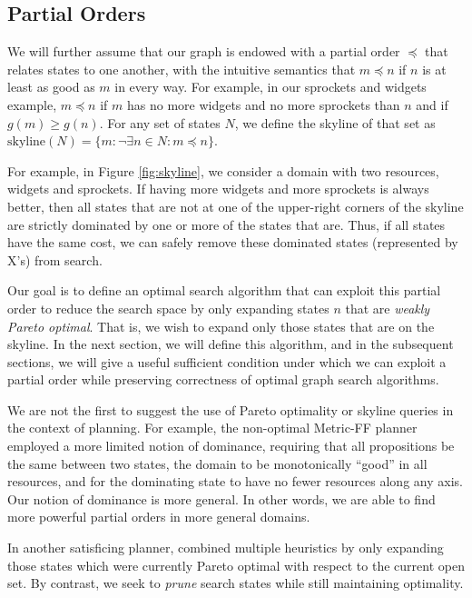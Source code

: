 \documentclass[letterpaper]{article}
\theoremstyle{plain} \newtheorem{theorem}{Theorem} \newtheorem{proposition}{Proposition} \newtheorem{lemma}{Lemma}
\theoremstyle{definition} \newtheorem{definition}{Definition} \newtheorem{conjecture}{Conjecture} \newtheorem*{example}{Example}
\theoremstyle{remark} \newtheorem*{remark}{Remark} \newtheorem*{note}{Note} \newtheorem{case}{Case}
\begin{document}
\subsection{Partial Orders}

We will further assume that our graph is endowed with a partial
order $\preceq$ that relates states to one another, with the
intuitive semantics that $m \preceq n$ if $n$ is at least as good as $m$
in every way. For example, in our sprockets and widgets example, $m
\preceq n$ if $m$ has no more widgets and no more sprockets than
$n$ and if $g(m) \ge g(n)$. For any
set of states $N$, we define the skyline of that set as
$\textrm{skyline}(N)=\{m: \neg\exists n \in N: m \preceq n\}$. 

For example, in Figure \ref{fig:skyline}, we consider a domain with
two resources, widgets and sprockets. If having more widgets and
more sprockets is always better, then all states that are not at one
of the upper-right corners of the skyline are strictly dominated by one or more
of the states that are.  Thus, if all states have the same cost,
we can safely remove these dominated states (represented by X's) from search.

Our goal is to define an optimal search algorithm that can exploit
this partial order to reduce the search space by only expanding
states $n$ that are \textit{weakly Pareto optimal}. That is, we
wish to expand only those states that are on the skyline. In the
next section, we will define this algorithm, and in the subsequent
sections, we will give a useful sufficient condition under which
we can exploit a partial order while preserving correctness of
optimal graph search algorithms.

We are not the first to suggest the use of Pareto optimality or
skyline queries in the context of planning. For example, the
non-optimal Metric-FF planner~\citep{hoffmann2003metric} employed
a more limited notion of dominance, requiring that all propositions
be the same between two states, the domain to be monotonically
``good'' in all resources, and for the dominating state to have no
fewer resources along any axis. Our notion of dominance is more
general. In other words, we are able to find more powerful partial
orders in more general domains.

In another satisficing planner, \citet{roger2010more} combined
multiple heuristics by only expanding those states which were
currently Pareto optimal with respect to the current open set.  By
contrast, we seek to \textit{prune} search states while still
maintaining optimality.
\end{document}
